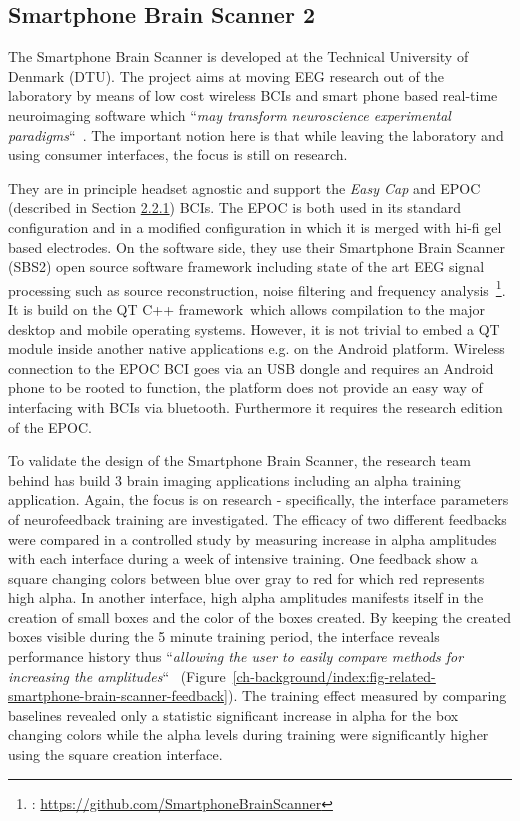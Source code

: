 \documentclass[a4paper,10pt,english,lof,lot,twoside]{puthesis}
\begin{document}
\subsection{Smartphone Brain Scanner 2}
\label{ch-background/index:smartphone-brain-scanner-2}\label{ch-background/index:ch-background-smartphone-brain-scanner-2}
The Smartphone Brain Scanner is developed at the Technical University of Denmark
(DTU). The project aims at moving EEG research out of the laboratory by means of
low cost wireless BCIs and smart phone based real-time neuroimaging software
which ``\emph{may transform neuroscience experimental paradigms}`` \cite{stopczynski_smartphones_2013}. The important notion here is that while
leaving the laboratory and using consumer interfaces, the focus is still on
research.

They are in principle headset agnostic and support the \emph{Easy Cap} and EPOC (described in Section {\hyperref[ch-background/index:ch-background-epoc]{2.2.1}})
BCIs. The EPOC is both used in its standard configuration and in a modified
configuration in which it is merged with hi-fi gel based electrodes. On the
software side, they use their Smartphone Brain Scanner (SBS2) open source
software framework including state of the art EEG signal processing such as
source reconstruction, noise filtering and frequency analysis \footnote{
: \href{https://github.com/SmartphoneBrainScanner}{https://github.com/SmartphoneBrainScanner}
}. It is build on the QT C++ framework \footnotemark[14] which allows compilation to the major desktop and
mobile operating systems. However, it is not trivial to embed a QT module inside
another native applications e.g. on the Android platform. Wireless connection to
the EPOC BCI goes via an USB dongle and requires an Android phone to be rooted
to function, the platform does not provide an easy way of interfacing with BCIs
via bluetooth. Furthermore it requires the research edition of the EPOC.

To validate the design of the Smartphone Brain Scanner, the research team behind
has build 3 brain imaging applications including an alpha training
application. Again, the focus is on research - specifically, the interface
parameters of neurofeedback training are investigated. The efficacy of two
different feedbacks were compared in a controlled study by measuring increase in
alpha amplitudes with each interface during a week of intensive training. One
feedback show a square changing colors between blue over gray to red for which
red represents high alpha. In another interface, high alpha amplitudes manifests
itself in the creation of small boxes and the color of the boxes created. By
keeping the created boxes visible during the 5 minute training period, the
interface reveals performance history thus ``\emph{allowing the user to easily compare
methods for increasing the amplitudes}`` \cite{stopczynski_smartphones_2013} (Figure \ref{ch-background/index:fig-related-smartphone-brain-scanner-feedback}). The training effect
measured by comparing baselines revealed only a statistic significant increase
in alpha for the box changing colors while the alpha levels during training were
significantly higher using the square creation interface.
\end{document}

